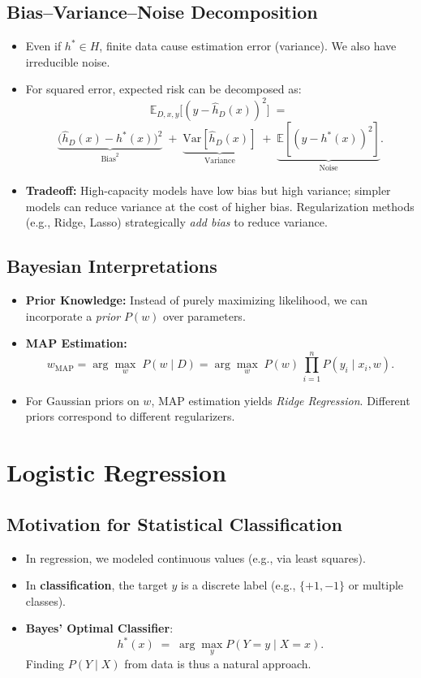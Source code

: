 \documentclass[twocolumn]{article}
\begin{document}
\begin{spacing}{1}
\subsection{Bias--Variance--Noise Decomposition}
\begin{itemize}
    \item Even if $h^* \in H$, finite data cause estimation error (variance). We also have irreducible noise.
    \item For squared error, expected risk can be decomposed as:
    \[
        \mathbb{E}_{D,x,y}\bigl[(y - \hat{h}_D(x))^2\bigr]
        \;=\;
    \]
    \[
        \underbrace{\bigl(\hat{h}_D(x) - h^*(x)\bigr)^2}_{\text{Bias}^2}
        \;+\;
        \underbrace{\mathrm{Var}[\hat{h}_D(x)]}_{\text{Variance}}
        \;+\;
        \underbrace{\mathbb{E}[(y - h^*(x))^2]}_{\text{Noise}}.
    \]
    \item \textbf{Tradeoff:} High-capacity models have low bias but high variance; simpler models can reduce variance at the cost of higher bias. Regularization methods (e.g., Ridge, Lasso) strategically \emph{add bias} to reduce variance.
\end{itemize}

\subsection{Bayesian Interpretations}
\begin{itemize}
    \item \textbf{Prior Knowledge:} Instead of purely maximizing likelihood, we can incorporate a \emph{prior} $P(w)$ over parameters.
    \item \textbf{MAP Estimation:} 
    \[
        w_{\text{MAP}}
        = \arg\max_w \; P(w \mid D)
        = \arg\max_w \; P(w)\,\prod_{i=1}^n P(y_i \mid x_i, w).
    \]
    \item For Gaussian priors on $w$, MAP estimation yields \emph{Ridge Regression}. Different priors correspond to different regularizers.
\end{itemize}

\section{Logistic Regression}

\subsection{Motivation for Statistical Classification}
\begin{itemize}
    \item In regression, we modeled continuous values (e.g., via least squares).
    \item In \textbf{classification}, the target $y$ is a discrete label (e.g., $\{+1, -1\}$ or multiple classes).
    \item \textbf{Bayes’ Optimal Classifier}:
    \[
        h^*(x) \;=\; \arg\max_{y} P(Y = y \mid X = x).
    \]
    Finding $P(Y \mid X)$ from data is thus a natural approach.  
\end{itemize}


\end{spacing}
\end{document}
